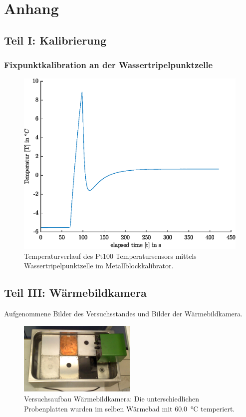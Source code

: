 \section{Anhang}

\subsection{Teil I: Kalibrierung}

\subsubsection{Fixpunktkalibration an der Wassertripelpunktzelle}

\begin{figure}[H]
	\centering
	\includegraphics[height=0.2\textheight]{../MLAB/Fixpunktkalibration.eps}
	\caption[Temperaturverlauf des Pt100 Temperatursensors mittels Wassertripelpunktzelle]{ Temperaturverlauf des Pt100 Temperatursensors mittels Wassertripelpunktzelle im Metallblockkalibrator.}
	\label{fig:Fixpunkt}
\end{figure}

\subsection{Teil III: Wärmebildkamera}

Aufgenommene Bilder des Versuchsstandes und Bilder der Wärmebildkamera. 

\begin{figure}[H]
		\centering
		\includegraphics[width=0.5\textwidth]{../FLIR_100/FLIR2240.jpg}
		\caption{Versuchsaufbau Wärmebildkamera: Die unterschiedlichen Probenplatten wurden im selben Wärmebad mit \SI{60,0}{\celsius} temperiert.}
		\label{fig:VersuchsaufbauWBK}
\end{figure}

